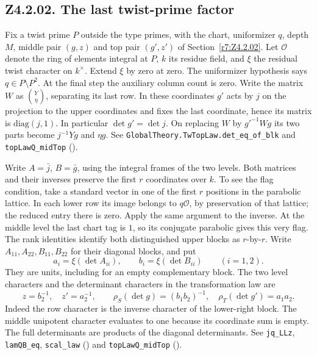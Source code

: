\subsection{Z4.2.02. The last twist-prime factor}\label{r8:Z4.2.02}
Fix a twist prime \(P\) outside the type primes, with the chart, uniformizer \(q\), depth \(M\), middle pair \((g,z)\) and top pair \((g',z')\) of Section~\ref{r7:Z4.2.02}. Let \(\mathcal O\) denote the ring of elements integral at \(P\), \(k\) its residue field, and \(\xi\) the residual twist character on \(k^\times\). Extend \(\xi\) by zero at zero. The uniformizer hypothesis says \(q\in P\setminus P^2\). At the final step the auxiliary column count is zero. Write the matrix \(W\) as \(\binom{Y}{\eta}\), separating its last row. In these coordinates \(g'\) acts by \(j\) on the projection to the upper coordinates and fixes the last coordinate, hence its matrix is \(\mathrm{diag}(j,1)\). In particular \(\det g'=\det j\). On replacing \(W\) by \(g'^{-1}Wg\) its two parts become \(j^{-1}Yg\) and \(\eta g\). See \nolinkurl{GlobalTheory.TwTopLaw.det_eq_of_blk} and \nolinkurl{topLawQ_midTop} ().

Write \(A=\bar j\), \(B=\bar g\), using the integral frames of the two levels. Both matrices and their inverses preserve the first \(r\) coordinates over \(k\). To see the flag condition, take a standard vector in one of the first \(r\) positions in the parabolic lattice. In each lower row its image belongs to \(q\mathcal O\), by preservation of that lattice; the reduced entry there is zero. Apply the same argument to the inverse. At the middle level the last chart tag is \(1\), so its conjugate parabolic gives this very flag. The rank identities identify both distinguished upper blocks as \(r\)-by-\(r\).
Write \(A_{11},A_{22},B_{11},B_{22}\) for their diagonal blocks, and put
\[
 a_i=\xi(\det A_{ii}),\qquad b_i=\xi(\det B_{ii})\qquad(i=1,2).
\]
They are units, including for an empty complementary block. The two level characters and the determinant characters in the transformation law are
\[
 z=b_2^{-1},\quad z'=a_2^{-1},\qquad
 \rho_S(\det g)=(b_1b_2)^{-1},\quad
 \rho_T(\det g')=a_1a_2 .
\]
Indeed the row character is the inverse character of the lower-right block. The middle unipotent character evaluates to one because its coordinate sum is empty. The full determinants are products of the diagonal determinants. See \nolinkurl{jq_LLz}, \nolinkurl{lamQB_eq}, \nolinkurl{scal_law} () and \nolinkurl{topLawQ_midTop} ().

